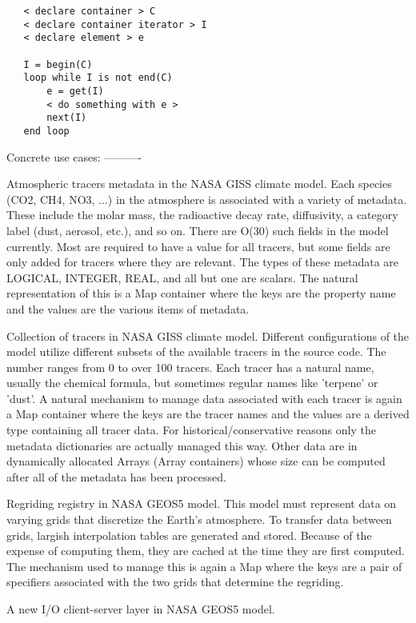 \documentclass{article}
\begin{document}
\begin{lstlisting}
   < declare container > C
   < declare container iterator > I
   < declare element > e

   I = begin(C)
   loop while I is not end(C)
       e = get(I)
       < do something with e >
       next(I)
   end loop
\end{lstlisting}    


Concrete use cases:
----------

Atmospheric tracers metadata in the NASA GISS climate model.  Each species (CO2, CH4, NO3, ...) in the atmosphere is associated with a variety of metadata.  These include the molar mass, the radioactive decay rate, diffusivity, a category label (dust, aerosol, etc.),   and so on.  There are O(30) such fields in the model currently.   Most are required to have a value for all tracers, but some fields   are only added for tracers where they are relevant.  The types of   these metadata are LOGICAL, INTEGER, REAL, and all but one are   scalars.  The natural representation of this is a Map container
   where the keys are the property name and the values are the various   items of metadata.

Collection of tracers in NASA GISS climate model.  Different   configurations of the model utilize different subsets of the   available tracers in the source code.  The number ranges from 0 to   over 100 tracers.  Each tracer has a natural name, usually the   chemical formula, but sometimes regular names like 'terpene' or   'dust'.  A natural mechanism to manage data associated with each
   tracer is again a Map container where the keys are the tracer names   and the values are a derived type containing all tracer data.  For   historical/conservative reasons only the metadata dictionaries are   actually managed this way.  Other data are in dynamically allocated
   Arrays (Array containers) whose size can be computed after all of   the metadata has been processed.

Regriding registry in NASA GEOS5 model.  This model must represent   data on varying grids that discretize the Earth's atmosphere.  To   transfer data between grids, largish interpolation tables are
   generated and stored.  Because of the expense of computing them,   they are cached at the time they are first computed.  The mechanism   used to manage this is again a Map where the keys are a pair of
   specifiers associated with the two grids that determine the   regriding.


A new I/O client-server layer in NASA GEOS5 model.   
\end{document}
